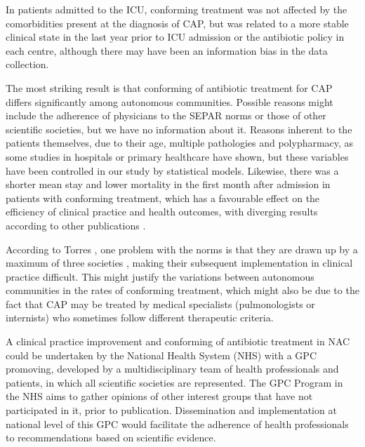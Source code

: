 \documentclass[11pt, a4paper]{article}
\begin{document}
\begin{multicols}{2}

In patients admitted to the ICU, conforming treatment was not affected by the comorbidities present at the diagnosis of CAP, but was related to a more stable clinical state in the last year prior to ICU admission or the antibiotic policy in each centre, although there may have been an information bias in the data collection.

The most striking result is that conforming of antibiotic treatment for CAP differs significantly among autonomous communities. Possible reasons might include the adherence of physicians to the SEPAR norms or those of other scientific societies, but we have no information about it. Reasons inherent to the patients themselves, due to their age, multiple pathologies and polypharmacy, as some studies in hospitals \cite{banqueri2014factors} or primary healthcare \cite{fernandez2013appropriateness, perez2002adecuacion} have shown, but these variables have been controlled in our study by statistical models. Likewise, there was a shorter mean stay and lower mortality in the first month after admission in patients with conforming treatment, which has a favourable effect on the efficiency of clinical practice and health outcomes, with diverging results according to other publications \cite{rossio2015adherence, ye2015improvement}.

According to Torres \cite{torres2013guia}, one problem with the norms is that they are drawn up by a maximum of three societies \cite{pachon2009clinical}, making their subsequent implementation in clinical practice difficult. This might justify the variations between autonomous communities in the rates of conforming treatment, which might also be due to the fact that CAP may be treated by medical specialists (pulmonologists or internists) who sometimes follow different therapeutic criteria.

A clinical practice improvement and conforming of antibiotic treatment in NAC could be undertaken by the National Health System (NHS) with a GPC promoving, developed by a multidisciplinary team of health professionals and patients, in which all scientific societies are represented. The GPC Program in the NHS aims to gather opinions of other interest groups that have not participated in it, prior to publication. Dissemination and implementation at national level of this GPC would facilitate the adherence of health professionals to recommendations based on scientific evidence.


\end{multicols}
\end{document}
